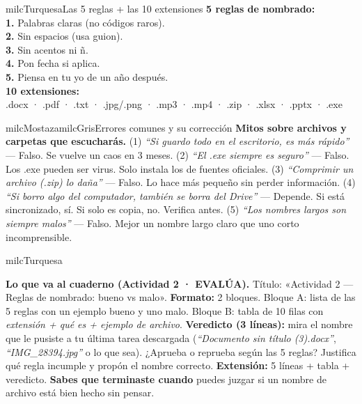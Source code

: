 \documentclass[11pt,letterpaper]{article}
\begin{document}
\begin{drawbox}{milcTurquesa}{Las 5 reglas + las 10 extensiones}
\textbf{5 reglas de nombrado:} \\[1mm]
\textbf{1.} Palabras claras (no códigos raros). \\[1mm]
\textbf{2.} Sin espacios (usa guion). \\[1mm]
\textbf{3.} Sin acentos ni ñ. \\[1mm]
\textbf{4.} Pon fecha si aplica. \\[1mm]
\textbf{5.} Piensa en tu yo de un año después. \\[1mm]
\textbf{10 extensiones:} \\[1mm]
.docx · .pdf · .txt · .jpg/.png · .mp3 · .mp4 · .zip · .xlsx · .pptx · .exe
\end{drawbox}

\begin{softbox}{milcMostaza}{milcGris}{Errores comunes y su corrección}
\textbf{Mitos sobre archivos y carpetas que escucharás.} (1) \emph{``Si guardo todo en el escritorio, es más rápido''} --- Falso. Se vuelve un caos en 3 meses. (2) \emph{``El .exe siempre es seguro''} --- Falso. Los .exe pueden ser virus. Solo instala los de fuentes oficiales. (3) \emph{``Comprimir un archivo (.zip) lo daña''} --- Falso. Lo hace más pequeño sin perder información. (4) \emph{``Si borro algo del computador, también se borra del Drive''} --- Depende. Si está sincronizado, sí. Si solo es copia, no. Verifica antes. (5) \emph{``Los nombres largos son siempre malos''} --- Falso. Mejor un nombre largo claro que uno corto incomprensible.
\end{softbox}

\begin{infoband}{milcTurquesa}


\textbf{Lo que va al cuaderno (Actividad 2 · EVALÚA).} Título: «Actividad 2 --- Reglas de nombrado: bueno vs malo». \textbf{Formato:} 2 bloques. Bloque A: lista de las 5 reglas con un ejemplo bueno y uno malo. Bloque B: tabla de 10 filas con \emph{extensión + qué es + ejemplo de archivo}. \textbf{Veredicto (3 líneas):} mira el nombre que le pusiste a tu última tarea descargada (\emph{``Documento sin título (3).docx''}, \emph{``IMG\_28394.jpg''} o lo que sea). ¿Aprueba o reprueba según las 5 reglas? Justifica qué regla incumple y propón el nombre correcto. \textbf{Extensión:} 5 líneas + tabla + veredicto. \textbf{Sabes que terminaste cuando} puedes juzgar si un nombre de archivo está bien hecho sin pensar.
\end{infoband}
\end{document}
